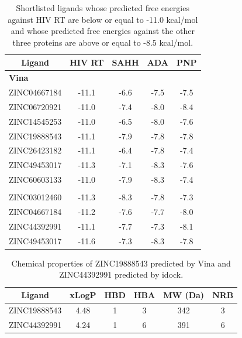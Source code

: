 \documentclass[10pt, conference, compsocconf]{IEEEtran}
\begin{document}
\begin{table}
\centering
\begin{tabular*}
{\linewidth}
{@{\extracolsep{\fill}}ccccc}
\toprule
Ligand & HIV RT & SAHH & ADA & PNP\\
\midrule
\multicolumn{5}{l}{\textbf{Vina}}\\
ZINC04667184 & -11.1 & -6.6 & -7.5 & -7.5\\
ZINC06720921 & -11.0 & -7.4 & -8.0 & -8.4\\
ZINC14545253 & -11.0 & -6.5 & -8.0 & -7.6\\
ZINC19888543 & -11.1 & -7.9 & -7.8 & -7.8\\
ZINC26423182 & -11.1 & -6.4 & -7.8 & -7.4\\
ZINC49453017 & -11.3 & -7.1 & -8.3 & -7.6\\
ZINC60603133 & -11.0 & -7.9 & -8.3 & -7.4\\
\noalign{\smallskip\smallskip}
\multicolumn{5}{l}{\textbf{idock}}\\
ZINC03012460 & -11.3 & -8.3 & -7.8 & -7.3\\
ZINC04667184 & -11.2 & -7.6 & -7.7 & -8.0\\
ZINC44392991 & -11.1 & -7.7 & -7.3 & -8.1\\
ZINC49453017 & -11.6 & -7.3 & -8.3 & -7.8\\
\bottomrule
\end{tabular*}
\caption{Shortlisted ligands whose predicted free energies against HIV RT are below or equal to -11.0 kcal/mol and whose predicted free energies against the other three proteins are above or equal to -8.5 kcal/mol.}
\label{tab:ShortlistedLigands}
\end{table}

\begin{table}
\centering
\begin{tabular*}
{\linewidth}
{@{\extracolsep{\fill}}cccccc}
\toprule
Ligand & xLogP & HBD & HBA & MW (Da) & NRB\\
\midrule
ZINC19888543 & 4.48 & 1 & 3 & 342 & 3\\
ZINC44392991 & 4.24 & 1 & 6 & 391 & 6\\
\bottomrule
\end{tabular*}
\caption{Chemical properties of ZINC19888543 predicted by Vina and ZINC44392991 predicted by idock.}
\label{tab:ZINC19888543-ZINC44392991}
\end{table}
\end{document}
